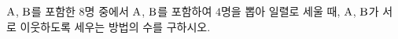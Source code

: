 $\mathrm{A}$, $\mathrm{B}$를 포함한 $8$명 중에서 $\mathrm{A}$, $\mathrm{B}$를 포함하여 $4$명을 뽑아 일렬로 세울 때, $\mathrm{A}$, $\mathrm{B}$가 서로 이웃하도록 세우는 방법의 수를 구하시오.
